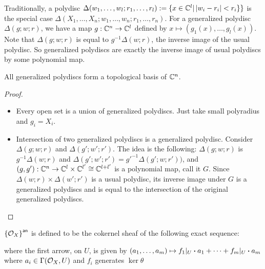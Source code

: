 \begin{remark}
	Traditionally, a polydisc $\Delta(w_{1},\dots, w_{l}; r_{1},\dots,r_{l}) := \{x \in \mathbb{C}^{l}| \left|w_{i}-r_{i}\right| < r_{i}\}\}$ is the special case $\Delta(X_{1},\dots,X_{n};w_{1},\dots,w_{n}; r_{1},\dots, r_{n})$. For a generalized polydisc $\Delta(g; w; r)$, we have a map $g : \mathbb{C}^{n}\to\mathbb{C}^{l}$ defined by $x \mapsto (g_{1}(x),\dots,g_{l}(x))$. Note that $\Delta(g; w; r)$ is equal to $g^{-1}\Delta(w; r)$, the inverse image of the usual polydisc. So generalized polydiscs are exactly the inverse image of usual polydiscs by some polynomial map.
\end{remark}

\begin{lemma}
	All generalized polydiscs form a topological basis of $\mathbb{C}^{n}$.
\end{lemma}
\begin{proof}
	\begin{itemize}
		\item Every open set is a union of generalized polydiscs. Just take small polyradius and $g_{i} = X_{i}$.
		\item Intersection of two generalized polydiscs is a generalized polydisc. Consider $\Delta(g; w; r)$ and $\Delta(g'; w'; r')$. The idea is the following: $\Delta(g; w; r)$ is $g^{-1}\Delta(w; r)$ and $\Delta(g'; w'; r') = {g'}^{-1}\Delta(g'; w; r'))$, and $(g, g') : \mathbb{C}^{n} \to \mathbb{C}^{l}\times\mathbb{C}^{l'}\cong \mathbb{C}^{l + l'}$ is a polynomial map, call it $G$. Since $\Delta(w; r) \times \Delta(w'; r')$ is a usual polydisc, its inverse image under $G$ is a generalized polydiscs and is equal to the intersection of the original generalized polydiscs.
	\end{itemize}
\end{proof}

\begin{definition}\label{def:analytification-sheaf}
	${\left\{{\mathcal{O}_{X}}\right\}}^{\mathsf{an}}$ is defined to be the cokernel sheaf of the following exact sequence:
	\begin{center}
	\end{center}
	where the first arrow, on $U$, is given by $(a_{1},\dots,a_{m}) \mapsto f_{1}|_{U}\boldsymbol{\cdot} a_{1}+\cdots+f_{m}|_{U}\boldsymbol{\cdot} a_{m}$ where $a_{i} \in \Gamma(\mathcal{O}_{X}, U)$ and $f_{i}$ generates $\ker\theta$

\end{definition}

